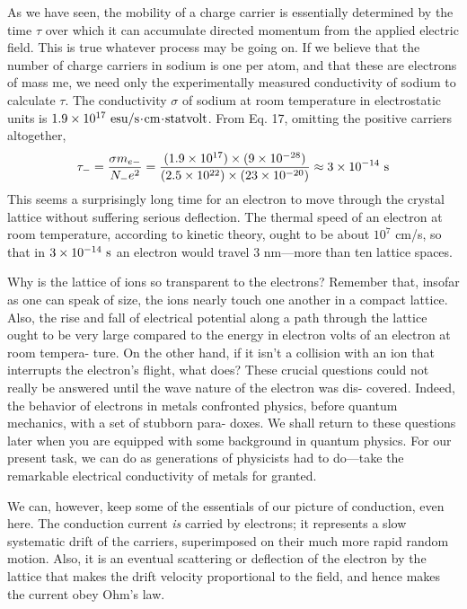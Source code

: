 As we have seen, the mobility of a charge carrier is essentially determined
by the time $\tau$ over which it can accumulate directed
momentum from the applied electric field. This is true whatever
process may be going on. If we believe that the number of charge
carriers in sodium is one per atom, and that these are electrons of
mass me, we need only the experimentally measured conductivity of
sodium to calculate $\tau$. The conductivity $\sigma$ of sodium at room
temperature in electrostatic units is $1.9 \times 10^{17}\ \esu/\sunit\unitdot\cmunit\unitdot\zu{statvolt}$.
From Eq. 17, omitting the positive carriers altogether,
\begin{equation}
  \tau_- = \frac{\sigma m_{e-}}{N_-e^2}
         = \frac{(1.9\times10^{17})\times(9\times10^{-28})}{(2.5\times10^{22})\times(23\times10^{-20})}
         \approx 3\times10^{-14}\ \textup{s}
\end{equation}
This seems a surprisingly long time for an electron to move through
the crystal lattice without suffering serious deflection. The thermal
speed of an electron at room temperature, according to kinetic
theory, ought to be about $10^7$ cm/s, so that in $3 \times 10^{-14}\ \sunit$ an
electron would travel 3 nm---more than ten lattice spaces.

Why is the lattice of ions so transparent to the electrons? Remember
that, insofar as one can speak of size, the ions nearly touch one
another in a compact lattice. Also, the rise and fall of electrical
potential along a path through the lattice ought to be very large compared
to the energy in electron volts of an electron at room tempera-
ture. On the other hand, if it isn't a collision with an ion that interrupts
the electron's flight, what does? These crucial questions could
not really be answered until the wave nature of the electron was dis-
covered. Indeed, the behavior of electrons in metals confronted
physics, before quantum mechanics, with a set of stubborn para-
doxes. We shall return to these questions later when you are
equipped with some background in quantum physics. For our
present task, we can do as generations of physicists had to do---take
the remarkable electrical conductivity of metals for granted.

We can, however, keep some of the essentials of our picture of
conduction, even here. The conduction current \emph{is} carried by electrons;
it represents a slow systematic drift of the carriers, superimposed
on their much more rapid random motion. Also, it is an
eventual scattering or deflection of the electron by the lattice that
makes the drift velocity proportional to the field, and hence makes
the current obey Ohm's law.

